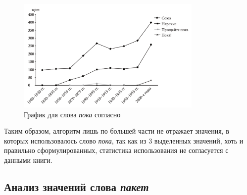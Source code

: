 \documentclass[LI,VKR]{HSEUniversity}
\begin{document}
\begin{figure}[H]
    \centering %
    \includegraphics[width=0.8\textwidth]{img/book/poka/all}
    \caption{График для слова \textit{пока} согласно~\cite{TwoCenturies}}
    \label{fig:TwoCenturiesPoka}
\end{figure}

Таким образом, алгоритм лишь по большей части не отражает значения, в которых использовалось
слово \textit{пока}, так как из 3 выделенных значений, хоть и правильно сформулированных,
статистика использования не согласуется с данными книги.

\subsection*{Анализ значений слова \textit{пакет}}
\end{document}
